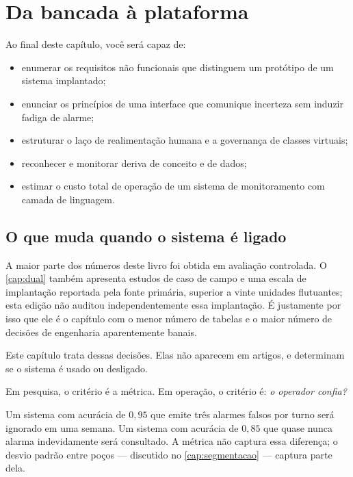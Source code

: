 \chapter{Da bancada à plataforma}
\label{cap:operacao}

\begin{objetivos}
Ao final deste capítulo, você será capaz de:
\begin{itemize}[leftmargin=*,itemsep=0.2em]
  \item enumerar os requisitos não funcionais que distinguem um protótipo de um sistema
        implantado;
  \item enunciar os princípios de uma interface que comunique incerteza sem induzir
        fadiga de alarme;
  \item estruturar o laço de realimentação humana e a governança de classes virtuais;
  \item reconhecer e monitorar deriva de conceito e de dados;
  \item estimar o custo total de operação de um sistema de monitoramento com camada de
        linguagem.
\end{itemize}
\end{objetivos}

\section{O que muda quando o sistema é ligado}

A maior parte dos números deste livro foi obtida em avaliação controlada. O
\cref{cap:dual} também apresenta estudos de caso de campo e uma escala de implantação
reportada pela fonte primária, superior a vinte unidades flutuantes; esta edição não
auditou independentemente essa implantação. É justamente por isso que ele é o capítulo
com o menor número de tabelas e o maior número de decisões de engenharia aparentemente
banais.

Este capítulo trata dessas decisões. Elas não aparecem em artigos, e determinam se o
sistema é usado ou desligado.

\begin{destaque}
Em pesquisa, o critério é a métrica. Em operação, o critério é: \emph{o operador confia?}

Um sistema com acurácia de $0{,}95$ que emite três alarmes falsos por turno será
ignorado em uma semana. Um sistema com acurácia de $0{,}85$ que quase nunca alarma
indevidamente será consultado. A métrica não captura essa diferença; o desvio padrão
entre poços --- discutido no \cref{cap:segmentacao} --- captura parte dela.
\end{destaque}

